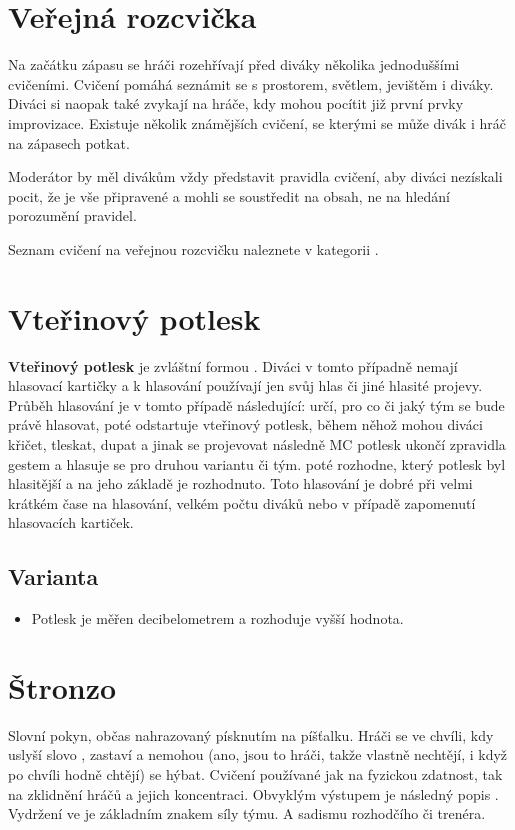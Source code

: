  
 
 
\needspace{5cm} \section{Veřejná rozcvička} \label{veřejná rozcvička} Na začátku zápasu se hráči rozehřívají před diváky několika jednoduššími cvičeními. Cvičení pomáhá seznámit se s prostorem, světlem, jevištěm i diváky. 
Diváci si naopak také zvykají na hráče, kdy mohou pocítit již první prvky improvizace. 
Existuje několik známějších cvičení, se kterými se může divák i hráč na zápasech potkat. 
 
Moderátor by měl divákům vždy představit pravidla cvičení, aby diváci nezískali pocit, že je vše připravené a mohli se soustředit na obsah, ne na hledání porozumění pravidel. 
 
Seznam cvičení na veřejnou rozcvičku naleznete v kategorii . 
 
 
\needspace{5cm} \section{Vteřinový potlesk} \label{vteřinový potlesk} \textbf{Vteřinový potlesk}{} je zvláštní formou . Diváci v tomto případně nemají hlasovací kartičky a k hlasování používají jen svůj hlas či jiné hlasité projevy. Průběh hlasování je v tomto případě následující:  určí, pro co či jaký tým se bude právě hlasovat, poté odstartuje vteřinový potlesk, během něhož mohou diváci křičet, tleskat, dupat a jinak se projevovat následně MC potlesk ukončí zpravidla gestem a hlasuje se pro druhou variantu či tým.  poté rozhodne, který potlesk byl hlasitější a na jeho základě je rozhodnuto. Toto hlasování je dobré při velmi krátkém čase na hlasování, velkém počtu diváků nebo v případě zapomenutí hlasovacích kartiček. 
 
\subsection{ Varianta } \begin{itemize}
\item Potlesk je měřen decibelometrem a rozhoduje vyšší hodnota.
\end{itemize}
 
 
 
\needspace{5cm} \section{Štronzo} \label{štronzo} Slovní pokyn, občas nahrazovaný písknutím na píšťalku. Hráči se ve chvíli, kdy uslyší slovo , zastaví a nemohou (ano, jsou to hráči, takže vlastně nechtějí, i když po chvíli hodně chtějí) se hýbat. Cvičení používané jak na fyzickou zdatnost, tak na zklidnění hráčů a jejich koncentraci. Obvyklým výstupem je následný popis . Vydržení ve  je základním znakem síly týmu. A sadismu rozhodčího či trenéra. 
 
